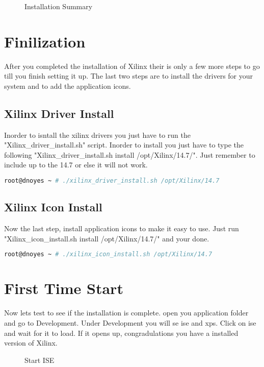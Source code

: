 \documentclass[letter]{article}
\begin{document}
\begin{figure}[!htbp]
  \centering
  \caption{Installation Summary}
\end{figure}

\newpage
\section{Finilization}
After you completed the installation of Xilinx their is only a few more steps to go till you finish setting it up. The last two steps are to install the drivers for your system and to add the application icons.

\subsection{Xilinx Driver Install}
Inorder to isntall the xilinx drivers you just have to run the "Xilinx\_driver\_install.sh" script. Inorder to install you just have to type the following "Xilinx\_driver\_install.sh install /opt/Xilinx/14.7/". Just remember to include up to the 14.7 or else it will not work.

\begin{lstlisting}[language=bash,caption={Xilinx\_driver\_install.sh example}]
root@dnoyes ~ # ./xilinx_driver_install.sh /opt/Xilinx/14.7
\end{lstlisting}

\subsection{Xilinx Icon Install}
Now the last step, install application icons to make it easy to use. Just run "Xilinx\_icon\_install.sh install /opt/Xilinx/14.7/" and your done.

\begin{lstlisting}[language=bash,caption={Xilinx\_icon\_install.sh example}]
root@dnoyes ~ # ./xilinx_icon_install.sh /opt/Xilinx/14.7
\end{lstlisting}

\section{First Time Start}
Now lets test to see if the installation is complete. open you application folder and go to Development. Under Development you will se ise and xps. Click on ise and wait for it to load. If it opens up, congradulations you have a installed version of Xilinx.

\begin{figure}[!htbp]
  \centering
  \caption{Start ISE}
\end{figure}
\end{document}
